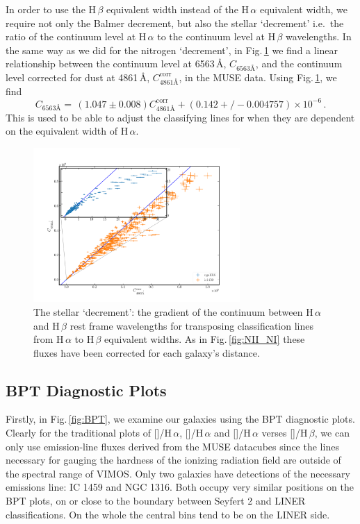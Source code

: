 		In order to use the H\,$\beta$ equivalent width instead of the H\,$\alpha$ equivalent width, we require not only the Balmer decrement, but also the stellar `decrement' i.e.\ the ratio of the continuum level at H\,$\alpha$ to the continuum level at H\,$\beta$ wavelengths. In the same way as we did for the nitrogen `decrement', in Fig.\,\ref{fig:stellarDec} we find a linear relationship between the continuum level at 6563\,\AA, $C_\text{6563\AA}$, and the continuum level corrected for dust at 4861\,\AA, $C^\text{corr}_\text{4861\AA}$, in the MUSE data. Using Fig.\,\ref{fig:stellarDec}, we find
		\begin{equation}
			C_\text{6563\AA} = \, (1.047\pm0.008) C^\text{corr}_\text{4861\AA} + (0.142+/-0.004757) \times 10^{-6} \, .
		\end{equation}
		This is used to be able to adjust the classifying lines for when they are dependent on the equivalent width of H\,$\alpha$. 

		\begin{figure}
			\centering
			\includegraphics[width=0.7\textwidth]{chapter5/stellar_ratio.png}
			\caption[The stellar `decrement']{The stellar `decrement': the gradient of the continuum between H\,$\alpha$ and H\,$\beta$ rest frame wavelengths for transposing classification lines from H\,$\alpha$ to H\,$\beta$ equivalent widths. As in Fig.\,\ref{fig:NII_NI} these fluxes have been corrected for each galaxy's distance.} 
			\label{fig:stellarDec}
		\end{figure}

	\subsection{BPT Diagnostic Plots}
		\label{subsec:BPT}
		Firstly, in Fig.\,\ref{fig:BPT}, we examine our galaxies using the BPT diagnostic plots. Clearly for the traditional plots of []/H\,$\alpha$, []/H\,$\alpha$ and []/H\,$\alpha$ verses []/H\,$\beta$, we can only use emission-line fluxes derived from the MUSE datacubes since the lines necessary for gauging the hardness of the ionizing radiation field are outside of the spectral range of VIMOS. Only two galaxies have detections of the necessary emissions line: IC 1459 and NGC 1316. Both occupy very similar positions on the BPT plots, on or close to the boundary between Seyfert 2 and LINER classifications. On the whole the central bins tend to be on the LINER side.

